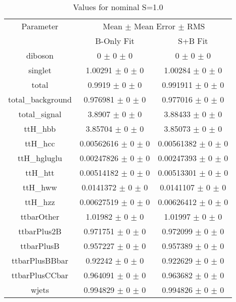 \begin{table}
\centering
\caption{Values for nominal S=1.0}
\begin{tabular}{ccc}
\toprule
Parameter 	& \multicolumn{2}{c}{Mean $\pm$ Mean Error $\pm$ RMS}\\
 	& B-Only Fit & S+B Fit\\
\midrule
diboson 	& \num{0} $\pm$ \num{0} $\pm$ \num{0} 	& \num{0} $\pm$ \num{0} $\pm$ \num{0}\\
singlet 	& \num{1.00291} $\pm$ \num{0} $\pm$ \num{0} 	& \num{1.00284} $\pm$ \num{0} $\pm$ \num{0}\\
total 	& \num{0.9919} $\pm$ \num{0} $\pm$ \num{0} 	& \num{0.991911} $\pm$ \num{0} $\pm$ \num{0}\\
total\_background 	& \num{0.976981} $\pm$ \num{0} $\pm$ \num{0} 	& \num{0.977016} $\pm$ \num{0} $\pm$ \num{0}\\
total\_signal 	& \num{3.8907} $\pm$ \num{0} $\pm$ \num{0} 	& \num{3.88433} $\pm$ \num{0} $\pm$ \num{0}\\
ttH\_hbb 	& \num{3.85704} $\pm$ \num{0} $\pm$ \num{0} 	& \num{3.85073} $\pm$ \num{0} $\pm$ \num{0}\\
ttH\_hcc 	& \num{0.00562616} $\pm$ \num{0} $\pm$ \num{0} 	& \num{0.00561382} $\pm$ \num{0} $\pm$ \num{0}\\
ttH\_hgluglu 	& \num{0.00247826} $\pm$ \num{0} $\pm$ \num{0} 	& \num{0.00247393} $\pm$ \num{0} $\pm$ \num{0}\\
ttH\_htt 	& \num{0.00514182} $\pm$ \num{0} $\pm$ \num{0} 	& \num{0.00513301} $\pm$ \num{0} $\pm$ \num{0}\\
ttH\_hww 	& \num{0.0141372} $\pm$ \num{0} $\pm$ \num{0} 	& \num{0.0141107} $\pm$ \num{0} $\pm$ \num{0}\\
ttH\_hzz 	& \num{0.00627519} $\pm$ \num{0} $\pm$ \num{0} 	& \num{0.00626412} $\pm$ \num{0} $\pm$ \num{0}\\
ttbarOther 	& \num{1.01982} $\pm$ \num{0} $\pm$ \num{0} 	& \num{1.01997} $\pm$ \num{0} $\pm$ \num{0}\\
ttbarPlus2B 	& \num{0.971751} $\pm$ \num{0} $\pm$ \num{0} 	& \num{0.972099} $\pm$ \num{0} $\pm$ \num{0}\\
ttbarPlusB 	& \num{0.957227} $\pm$ \num{0} $\pm$ \num{0} 	& \num{0.957389} $\pm$ \num{0} $\pm$ \num{0}\\
ttbarPlusBBbar 	& \num{0.92242} $\pm$ \num{0} $\pm$ \num{0} 	& \num{0.922629} $\pm$ \num{0} $\pm$ \num{0}\\
ttbarPlusCCbar 	& \num{0.964091} $\pm$ \num{0} $\pm$ \num{0} 	& \num{0.963682} $\pm$ \num{0} $\pm$ \num{0}\\
wjets 	& \num{0.994829} $\pm$ \num{0} $\pm$ \num{0} 	& \num{0.994826} $\pm$ \num{0} $\pm$ \num{0}\\
\bottomrule
\end{tabular}
\end{table}